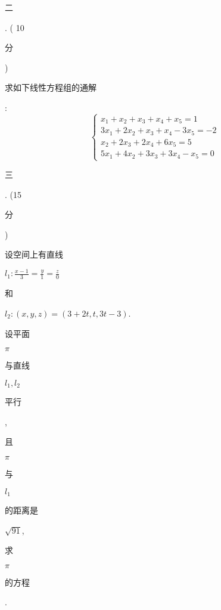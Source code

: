\documentclass[10pt]{article}
\begin{document}
\begin{CJK}{UTF8}{mj}二\end{CJK}. ( 10 \begin{CJK}{UTF8}{mj}分\end{CJK}) \begin{CJK}{UTF8}{mj}求如下线性方程组的通解\end{CJK}:
$$
\left\{\begin{array}{l}
x_{1}+x_{2}+x_{3}+x_{4}+x_{5}=1 \\
3 x_{1}+2 x_{2}+x_{3}+x_{4}-3 x_{5}=-2 \\
x_{2}+2 x_{3}+2 x_{4}+6 x_{5}=5 \\
5 x_{1}+4 x_{2}+3 x_{3}+3 x_{4}-x_{5}=0
\end{array}\right.
$$
\begin{CJK}{UTF8}{mj}三\end{CJK}. (15 \begin{CJK}{UTF8}{mj}分\end{CJK}) \begin{CJK}{UTF8}{mj}设空间上有直线\end{CJK} $l_{1}: \frac{x-1}{3}=\frac{y}{1}=\frac{z}{0}$ \begin{CJK}{UTF8}{mj}和\end{CJK} $l_{2}:(x, y, z)=(3+2 t, t, 3 t-3)$. \begin{CJK}{UTF8}{mj}设平面\end{CJK} $\pi$ \begin{CJK}{UTF8}{mj}与直线\end{CJK} $l_{1}, l_{2}$ \begin{CJK}{UTF8}{mj}平行\end{CJK}, \begin{CJK}{UTF8}{mj}且\end{CJK} $\pi$ \begin{CJK}{UTF8}{mj}与\end{CJK} $l_{1}$ \begin{CJK}{UTF8}{mj}的距离是\end{CJK} $\sqrt{91}$, \begin{CJK}{UTF8}{mj}求\end{CJK} $\pi$ \begin{CJK}{UTF8}{mj}的方程\end{CJK}.
\end{document}
